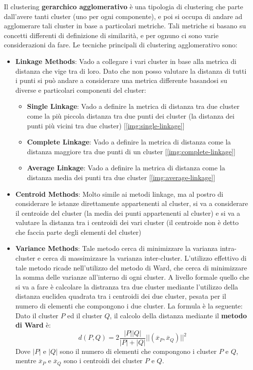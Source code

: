 Il clustering \textbf{gerarchico agglomerativo} è una tipologia di clustering che parte dall'avere tanti cluster (uno per ogni componente), e poi si occupa di andare ad agglomerare tali cluster in base a particolari metriche. Tali metriche si basano su concetti differenti di definizione di similarità, e per ognuno ci sono varie considerazioni da fare. Le tecniche principali di clustering agglomerativo sono:
\begin{itemize}
    \item \textbf{Linkage Methods}: Vado a collegare i vari cluster in base alla metrica di distanza che vige tra di loro. Dato che non posso valutare la distanza di tutti i punti si può andare a considerare una metrica differente basandosi su diverse e particolari componenti del cluster:
    \begin{itemize}
        \item \textbf{Single Linkage}: Vado a definire la metrica di distanza tra due cluster come la più piccola distanza tra due punti dei cluster (la distanza dei punti più vicini tra due cluster) [\ref{img:single-linkage}]
        \item \textbf{Complete Linkage}: Vado a definire la metrica di distanza come la distanza maggiore tra due punti di un cluster [\ref{img:complete-linkage}]
        \item \textbf{Average Linkage}: Vado a definire la metrica di distanza come la distanza media dei punti tra due cluster [\ref{img:average-linkage}]
    \end{itemize}

    \item \textbf{Centroid Methods}: Molto simile ai metodi linkage, ma al postro di considerare le istanze direttamente appartenenti al cluster, si va a considerare il centroide del cluster (la media dei punti appartenenti al cluster) e si va a valutare la distanza tra i centroidi dei vari cluster (il centroide non è detto che faccia parte degli elementi del cluster)

    \item \textbf{Variance Methods}: Tale metodo cerca di minimizzare la varianza intra-cluster e cerca di massimizzare la varianza inter-cluster. L'utilizzo effettivo di tale metodo ricade nell'utilizzo del metodo di Ward, che cerca di minimizzare la somma delle varianze all'interno di ogni cluster. A livello formale quello che si va a fare è calcolare la distranza tra due cluster mediante l'utilizzo della distanza euclidea quadrata tra i centroidi dei due cluster, pesata per il numero di elementi che compongono i due cluster. La formula è la seguente:
    Dato il cluster \(P\) ed il cluster \(Q\), il calcolo della distanza mediante il \textbf{metodo di Ward} è:
    \[
    d(P,Q) = 2\frac{|P||Q|}{|P| + |Q|}||(\overline{x}_{P},\overline{x}_{Q})||^2
    \]
    Dove \(|P|\) e \(|Q|\) sono il numero di elementi che compongono i cluster \(P\) e \(Q\), mentre \(\overline{x}_{P}\) e \(\overline{x}_{Q}\) sono i centroidi dei cluster \(P\) e \(Q\).
\end{itemize}

